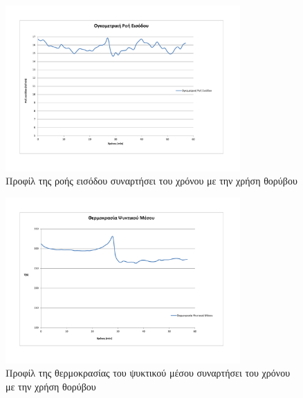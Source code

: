 \documentclass[11pt]{article} %
\numberwithin{equation}{subsection}
\begin{document}
\begin{figure}[H]
    \centering
    \includegraphics[width=0.8\textwidth]{noise_f.pdf}
    \caption{Προφίλ της ροής εισόδου συναρτήσει του χρόνου με την χρήση θορύβου}
    \label{fig:noise_f}
\end{figure}

\begin{figure}[H]
    \centering
    \includegraphics[width=0.8\textwidth]{noise_t_cool.pdf}
    \caption{Προφίλ της θερμοκρασίας του ψυκτικού μέσου συναρτήσει του χρόνου με την χρήση θορύβου}
    \label{fig:noise_t_cool}
\end{figure}
\end{document}
